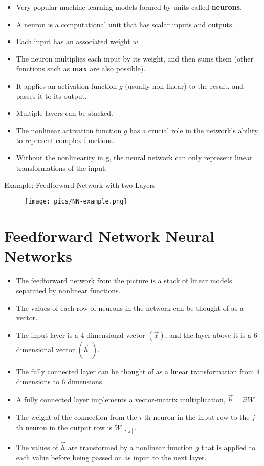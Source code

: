 
\begin{itemize}
\item Very popular machine learning models formed by units called \textbf{neurons}.
\item A neuron is a computational unit that has scalar inputs and outputs. 
\item  Each input has an associated weight $w$.
 \item The neuron multiplies each input by its weight, and then sums them (other functions such as \textbf{max} are also possible). 
\item It applies an activation function $g$ (usually non-linear) to the result, and passes it to its output.
\item Multiple layers can be stacked.
\item The nonlinear activation function $g$ has a crucial role in the network's ability to represent complex functions. 
\item Without the nonlinearity in g, the neural network can only represent linear transformations of the input.
\end{itemize}


Example: Feedforward Network with two Layers


\begin{figure}[htb]
	\centering
	 \texttt{[image: pics/NN-example.png]}
\end{figure}





\section{Feedforward Network Neural Networks}

\begin{itemize}
\item The feedforward network from the picture is a stack of linear models separated by nonlinear functions.
\item The values of each row of neurons in the network can be thought of as a vector. 

\item The input layer is a 4-dimensional vector $(\vec{x})$, and the layer above it is a 6-dimensional vector $(\vec{h}^1)$.
\item The fully connected layer can be thought of as a linear transformation from 4 dimensions to 6 dimensions. 
\item A fully connected layer implements a vector-matrix multiplication, $\vec{h}=\vec{x}W$.
\item The weight of the connection from the $i$-th neuron in the input row to the $j$-th neuron in the output row is $W_{[i,j]}$.
\item The values of $\vec{h}$ are transformed by a nonlinear function $g$ that is applied to each value before being passed on as input to the next layer.

\end{itemize}

